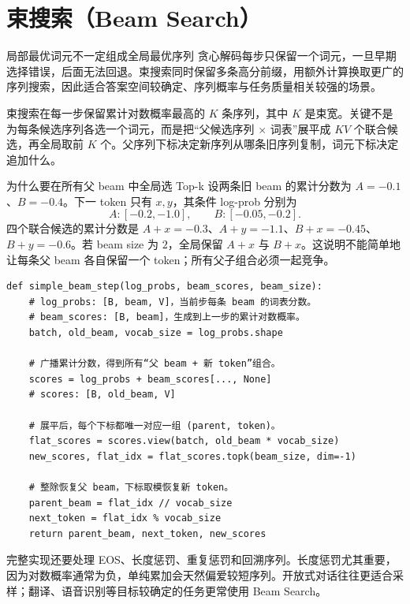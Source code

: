 \section{束搜索（Beam Search）}

\begin{motivationbox}{局部最优词元不一定组成全局最优序列}
贪心解码每步只保留一个词元，一旦早期选择错误，后面无法回退。束搜索同时保留多条高分前缀，用额外计算换取更广的序列搜索，因此适合答案空间较确定、序列概率与任务质量相关较强的场景。
\end{motivationbox}

束搜索在每一步保留累计对数概率最高的 $K$ 条序列，其中 $K$ 是束宽。关键不是为每条候选序列各选一个词元，而是把“父候选序列 $\times$ 词表”展平成 $KV$ 个联合候选，再全局取前 $K$ 个。父序列下标决定新序列从哪条旧序列复制，词元下标决定追加什么。

\begin{examplebox}{为什么要在所有父 beam 中全局选 Top-k}
设两条旧 beam 的累计分数为 $A=-0.1$、$B=-0.4$。下一 token 只有 $x,y$，其条件 log-prob 分别为
\[
A:[-0.2,-1.0],\qquad B:[-0.05,-0.2].
\]
四个联合候选的累计分数是 $A+x=-0.3$、$A+y=-1.1$、$B+x=-0.45$、$B+y=-0.6$。若 beam size 为 $2$，全局保留 $A+x$ 与 $B+x$。这说明不能简单地让每条父 beam 各自保留一个 token；所有父子组合必须一起竞争。
\end{examplebox}


\begin{lstlisting}
def simple_beam_step(log_probs, beam_scores, beam_size):
    # log_probs: [B, beam, V]，当前步每条 beam 的词表分数。
    # beam_scores: [B, beam]，生成到上一步的累计对数概率。
    batch, old_beam, vocab_size = log_probs.shape

    # 广播累计分数，得到所有“父 beam + 新 token”组合。
    scores = log_probs + beam_scores[..., None]
    # scores: [B, old_beam, V]

    # 展平后，每个下标都唯一对应一组 (parent, token)。
    flat_scores = scores.view(batch, old_beam * vocab_size)
    new_scores, flat_idx = flat_scores.topk(beam_size, dim=-1)

    # 整除恢复父 beam，下标取模恢复新 token。
    parent_beam = flat_idx // vocab_size
    next_token = flat_idx % vocab_size
    return parent_beam, next_token, new_scores
\end{lstlisting}

完整实现还要处理 EOS、长度惩罚、重复惩罚和回溯序列。长度惩罚尤其重要，因为对数概率通常为负，单纯累加会天然偏爱较短序列。开放式对话往往更适合采样；翻译、语音识别等目标较确定的任务更常使用 Beam Search。

